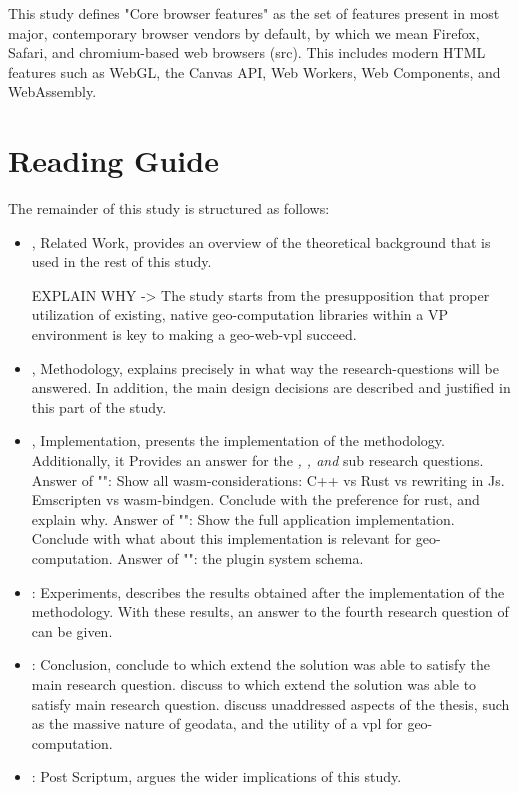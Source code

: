 This study defines "Core browser features" as the set of features present in most major, contemporary browser vendors by default, by which we mean Firefox, Safari, and chromium-based web browsers (src). 
This includes modern HTML features such as WebGL, the Canvas API, Web Workers, Web Components, and WebAssembly. 

\newpage
\section{Reading Guide}

The remainder of this study is structured as follows:
\begin{itemize}[ ]
  \item {}, Related Work, provides an overview of the theoretical background that is used in the rest of this study.
  
  \begin{note}
    EXPLAIN WHY -> The study starts from the presupposition that proper utilization of existing, native geo-computation libraries within a VP environment is key to making a geo-web-vpl succeed. 
  \end{note}


  \item {}, Methodology, explains precisely in what way the research-questions will be answered. In addition, the main design decisions are described and justified in this part of the study.

  \item {}, Implementation, presents the implementation of the methodology. Additionally, it Provides an answer for the \textit{\mySubRQOneTitle, \mySubRQTwoTitle , and \mySubRQThreeTitle} sub research questions. 
  \subitem Answer of "\mySubRQOneTitle": Show all wasm-considerations: C++ vs Rust vs rewriting in Js. Emscripten vs wasm-bindgen. Conclude with the preference for rust, and explain why.
  \subitem Answer of "\mySubRQTwoTitle": Show the full application implementation. Conclude with what about this implementation is relevant for geo-computation. 
  \subitem Answer of "\mySubRQThreeTitle": the plugin system schema. 
  
  \item {}: Experiments, describes the results obtained after the implementation of the methodology. With these results, an answer to the fourth research question of \mySubRQFourTitle can be given. 

  \item {}: Conclusion, 
  \subitem conclude to which extend the solution was able to satisfy the main research question. 
  \subitem discuss to which extend the solution was able to satisfy main research question.
  \subitem discuss unaddressed aspects of the thesis, such as the massive nature of geodata, and the utility of a vpl for geo-computation.

  \item {}: Post Scriptum, argues the wider implications of this study. 

\end{itemize}

